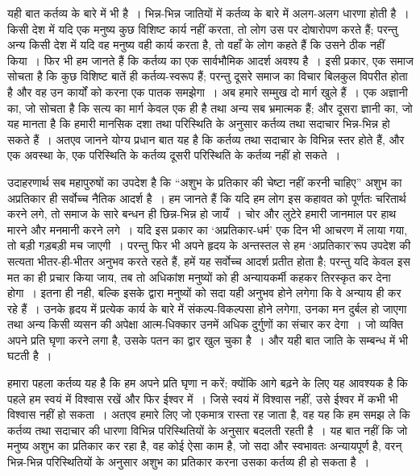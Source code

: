 यही बात कर्तव्य के बारे में भी है~। भिन्न-भिन्न जातियों में कर्तव्य के बारे में अलग-अलग धारणा होती है~। किसी देश में यदि एक मनुष्य कुछ विशिष्ट कार्य नहीं करता, तो लोग उस पर दोषारोपण करते हैं; परन्तु अन्य किसी देश में यदि वह मनुष्य वही कार्य करता है, तो वहाँ के लोग कहते हैं कि उसने ठीक नहीं किया~। फिर भी हम जानते हैं कि कर्तव्य का एक सार्वभौमिक आदर्श अवश्य है~। इसी प्रकार, एक समाज सोचता है कि कुछ विशिष्ट बातें ही कर्तव्य-स्वरूप हैं; परन्तु दूसरे समाज का विचार बिलकुल विपरीत होता है और वह उन कार्यों को करना एक पातक समझेगा~। अब हमारे सम्मुख दो मार्ग खुले हैं~। एक अज्ञानी का, जो सोचता है कि सत्य का मार्ग केवल एक ही है तथा अन्य सब भ्रमात्मक हैं; और दूसरा ज्ञानी का, जो यह मानता है कि हमारी मानसिक दशा तथा परिस्थिति के अनुसार कर्तव्य तथा सदाचार भिन्न-भिन्न हो सकते हैं~। अतएव जानने योग्य प्रधान बात यह है कि कर्तव्य तथा सदाचार के विभिन्न स्तर होते हैं, और एक अवस्था के, एक परिस्थिति के कर्तव्य दूसरी परिस्थिति के कर्तव्य नहीं हो सकते~।

उदाहरणार्थ सब महापुरुषों का उपदेश है कि “अशुभ के प्रतिकार की चेष्टा नहीं करनी चाहिए” अशुभ का अप्रतिकार ही सर्वोच्च नैतिक आदर्श है~। हम जानते हैं कि यदि हम लोग इस कहावत को पूर्णतः चरितार्थ करने लगे, तो समाज के सारे बन्धन ही छिन्न-भिन्न हो जायँ~। चोर और लुटेरे हमारी जानमाल पर हाथ मारने और मनमानी करने लगे~। यदि इस प्रकार का ‘अप्रतिकार-धर्म’ एक दिन भी आचरण में लाया गया, तो बड़ी गड़बड़ी मच जाएगी~। परन्तु फिर भी अपने हृदय के अन्तस्तल से हम ‘अप्रतिकार’रूप उपदेश की सत्यता भीतर-ही-भीतर अनुभव करते रहते हैं, हमें यह सर्वोच्च आदर्श प्रतीत होता है; परन्तु यदि केवल इस मत का ही प्रचार किया जाय, तब तो अधिकांश मनुष्यों को ही अन्यायकर्मी कहकर तिरस्कृत कर देना होगा~। इतना ही नही, बल्कि इसके द्वारा मनुष्यों को सदा यही अनुभव होने लगेगा कि वे अन्याय ही कर रहे हैं~। उनके हृदय में प्रत्येक कार्य के बारे में संकल्प-विकल्पसा होने लगेगा, उनका मन दुर्बल हो जाएगा तथा अन्य किसी व्यसन की अपेक्षा आत्म-धिक्कार उनमें अधिक दुर्गुणों का संचार कर देगा~। जो व्यक्ति अपने प्रति घृणा करने लगा है, उसके पतन का द्वार खुल चुका है~। और यही बात जाति के सम्बन्ध में भी घटती है~।

हमारा पहला कर्तव्य यह है कि हम अपने प्रति घृणा न करें; क्योंकि आगे बढ़ने के लिए यह आवश्यक है कि पहले हम स्वयं में विश्वास रखें और फिर ईश्वर में~। जिसे स्वयं में विश्वास नहीं, उसे ईश्वर में कभी भी विश्वास नहीं हो सकता~। अतएव हमारे लिए जो एकमात्र रास्ता रह जाता है, वह यह कि हम समझ ले कि कर्तव्य तथा सदाचार की धारणा विभिन्न परिस्थितियों के अनुसार बदलती रहती है~। यह बात नहीं कि जो मनुष्य अशुभ का प्रतिकार कर रहा है, वह कोई ऐसा काम है, जो सदा और स्वभावतः अन्यायपूर्ण है, वरन् भिन्न-भिन्न परिस्थितियों के अनुसार अशुभ का प्रतिकार करना उसका कर्तव्य ही हो सकता है~।

